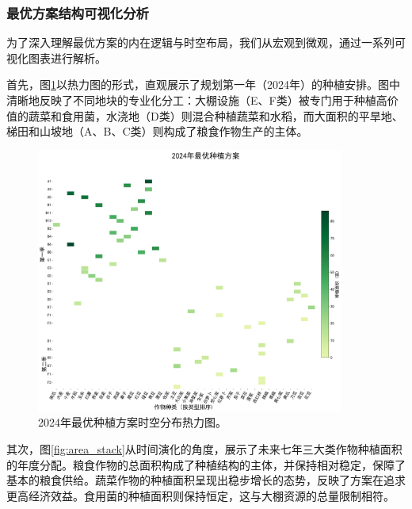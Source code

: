 \subsubsection{最优方案结构可视化分析}
为了深入理解最优方案的内在逻辑与时空布局，我们从宏观到微观，通过一系列可视化图表进行解析。

首先，图\ref{fig:optimal_solution_2024}以热力图的形式，直观展示了规划第一年（2024年）的种植安排。图中清晰地反映了不同地块的专业化分工：大棚设施（E、F类）被专门用于种植高价值的蔬菜和食用菌，水浇地（D类）则混合种植蔬菜和水稻，而大面积的平旱地、梯田和山坡地（A、B、C类）则构成了粮食作物生产的主体。

\begin{figure}[H]
    \centering
    \includegraphics[width=0.9\textwidth]{figs/5问题三/2024年最优种植方案.png}
    \caption{2024年最优种植方案时空分布热力图。}
    \label{fig:optimal_solution_2024}
\end{figure}

其次，图\ref{fig:area_stack}从时间演化的角度，展示了未来七年三大类作物种植面积的年度分配。粮食作物的总面积构成了种植结构的主体，并保持相对稳定，保障了基本的粮食供给。蔬菜作物的种植面积呈现出稳步增长的态势，反映了方案在追求更高经济效益。食用菌的种植面积则保持恒定，这与大棚资源的总量限制相符。

